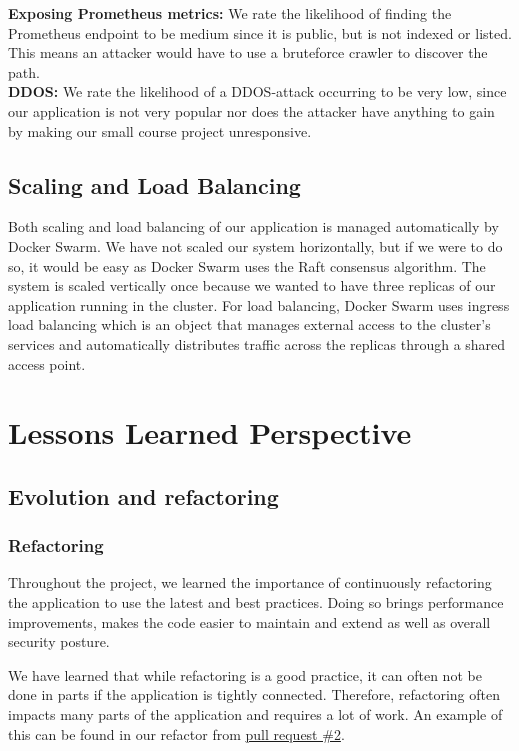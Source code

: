 \documentclass{article}
\begin{document}
\textbf{Exposing Prometheus metrics:} We rate the likelihood of finding the Prometheus endpoint to be medium since it is public, but is not indexed or listed. This means an attacker would have to use a bruteforce crawler to discover the path.\\

\textbf{DDOS:} We rate the likelihood of a DDOS-attack occurring to be very low, since our application is not very popular nor does the attacker have anything to gain by making our small course project unresponsive.\\

\subsection{Scaling and Load Balancing}
Both scaling and load balancing of our application is managed automatically by Docker Swarm. We have not scaled our system horizontally, but if we were to do so, it would be easy as Docker Swarm uses the Raft consensus algorithm\cite{raft}. The system is scaled vertically once because we wanted to have three replicas of our application running in the cluster. For load balancing, Docker Swarm uses ingress load balancing which is an object that manages external access to the cluster's services and automatically distributes traffic across the replicas through a shared access point.

\newpage
\section{Lessons Learned Perspective}
\subsection{Evolution and refactoring}
\subsubsection{Refactoring}
Throughout the project, we learned the importance of continuously refactoring the application to use the latest and best practices. Doing so brings performance improvements, makes the code easier to maintain and extend as well as overall security posture.

We have learned that while refactoring is a good practice, it can often not be done in parts if the application is tightly connected. Therefore, refactoring often impacts many parts of the application and requires a lot of work. An example of this can be found in our refactor from \href{https://github.com/AlexBMJ/minitwit/pull/2}{pull request \#2}. 
\end{document}

